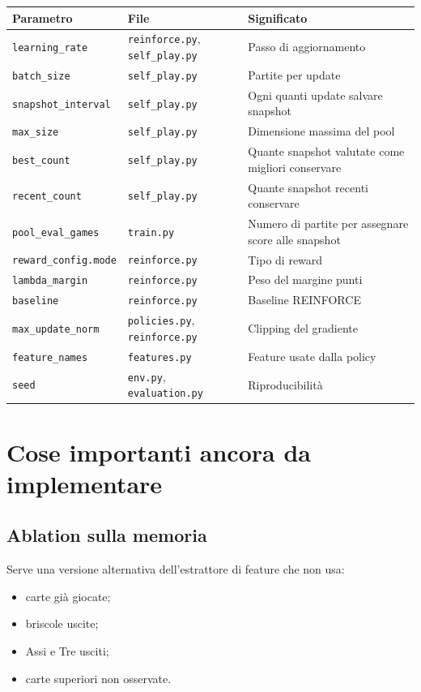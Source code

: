 \documentclass[11pt,a4paper]{article}
\begin{document}
\begin{center}
\begin{tabular}{lll}
\toprule
Parametro & File & Significato \\
\midrule
\texttt{learning\_rate} & \texttt{reinforce.py}, \texttt{self\_play.py} & Passo di aggiornamento \\
\texttt{batch\_size} & \texttt{self\_play.py} & Partite per update \\
\texttt{snapshot\_interval} & \texttt{self\_play.py} & Ogni quanti update salvare snapshot \\
\texttt{max\_size} & \texttt{self\_play.py} & Dimensione massima del pool \\
\texttt{best\_count} & \texttt{self\_play.py} & Quante snapshot valutate come migliori conservare \\
\texttt{recent\_count} & \texttt{self\_play.py} & Quante snapshot recenti conservare \\
\texttt{pool\_eval\_games} & \texttt{train.py} & Numero di partite per assegnare score alle snapshot \\
\texttt{reward\_config.mode} & \texttt{reinforce.py} & Tipo di reward \\
\texttt{lambda\_margin} & \texttt{reinforce.py} & Peso del margine punti \\
\texttt{baseline} & \texttt{reinforce.py} & Baseline REINFORCE \\
\texttt{max\_update\_norm} & \texttt{policies.py}, \texttt{reinforce.py} & Clipping del gradiente \\
\texttt{feature\_names} & \texttt{features.py} & Feature usate dalla policy \\
\texttt{seed} & \texttt{env.py}, \texttt{evaluation.py} & Riproducibilità \\
\bottomrule
\end{tabular}
\end{center}

\section{Cose importanti ancora da implementare}

\subsection{Ablation sulla memoria}

Serve una versione alternativa dell'estrattore di feature che non usa:

\begin{itemize}
  \item carte già giocate;
  \item briscole uscite;
  \item Assi e Tre usciti;
  \item carte superiori non osservate.
\end{itemize}
\end{document}
